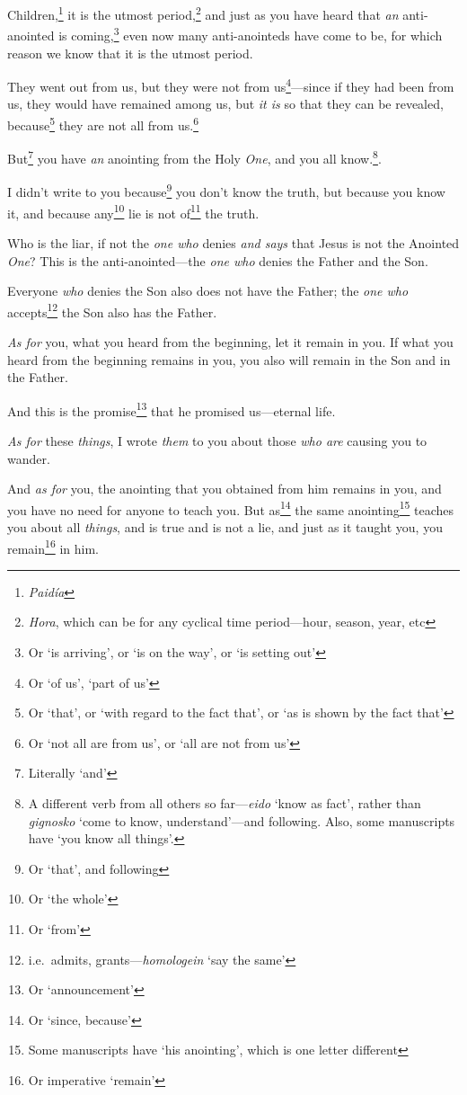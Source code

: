 \documentclass[article]{memoir}%
\newcounter{vnum}
\newcommand{\vnum}{%
	\textsuperscript{\thevnum}%
	\addtocounter{vnum}{1}%
}
\newcommand{\infer}[1]{\textit{#1}}
\newcommand{\lx}[1]{\textit{#1}}
\newcommand{\lxx}[2]{\textit{#1} `#2'}
\begin{document}
\vnum Children,\footnote{\lx{Paidía}} it is the utmost period,\footnote{\lx{Hora}, which can be for any cyclical time period---hour, season, year, etc} and just as you have heard that \infer{an} anti-anointed is coming,\footnote{Or `is arriving', or `is on the way', or `is setting out'} even now many anti-anointeds have come to be, for which reason we know that it is the utmost period. \vnum They went out from us, but they were not from us\footnote{Or `of us', `part of us'}---since if they had been from us, they would have remained among us, but \infer{it is} so that they can be revealed, because\footnote{Or `that', or `with regard to the fact that', or `as is shown by the fact that'} they are not all from us.\footnote{Or `not all are from us', or `all are not from us'} \vnum But\footnote{Literally `and'} you have \infer{an} anointing from the Holy \infer{One}, and you all know.\footnote{A different verb from all others so far---\lxx{eido}{know as fact}, rather than \lxx{gignosko}{come to know, understand}---and following. Also, some manuscripts have `you know all things'.}. \vnum I didn't write to you because\footnote{Or `that', and following} you don't know the truth, but because you know it, and because any\footnote{Or `the whole'} lie is not of\footnote{Or `from'} the truth. \vnum Who is the liar, if not the \infer{one who} denies \infer{and says} that Jesus is not the Anointed \infer{One}? This is the anti-anointed---the \infer{one who} denies the Father and the Son. \vnum Everyone \infer{who} denies the Son also does not have the Father; the \infer{one who} accepts\footnote{i.e.\ admits, grants---\lxx{homologein}{say the same}} the Son also has the Father. \vnum \infer{As for} you, what you heard from the beginning, let it remain in you. If what you heard from the beginning remains in you, you also will remain in the Son and in the Father. \vnum And this is the promise\footnote{Or `announcement'} that he promised us---eternal life.

\vnum \infer{As for} these \infer{things}, I wrote \infer{them} to you about those \infer{who are} causing you to wander. \vnum And \infer{as for} you, the anointing that you obtained from him remains in you, and you have no need for anyone to teach you.	But as\footnote{Or `since, because'} the same anointing\footnote{Some manuscripts have `his anointing', which is one letter different} teaches you about all \infer{things}, and is true and is not a lie, and just as it taught you, you remain\footnote{Or imperative `remain'} in him.
\end{document}
